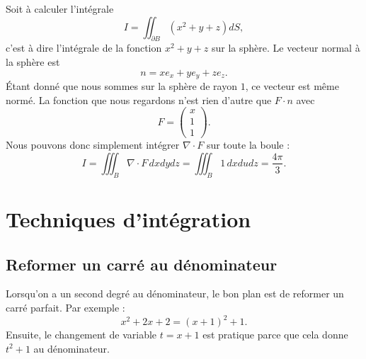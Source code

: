 \begin{example}
    Soit à calculer l'intégrale
    \begin{equation}
        I=\iint_{\partial B}(x^2+y+z)dS,
    \end{equation}
    c'est à dire l'intégrale de la fonction $x^2+y+z$ sur la sphère. Le vecteur normal à la sphère est
    \begin{equation}
        n=xe_x+ye_y+ze_z.
    \end{equation}
    Étant donné que nous sommes sur la sphère de rayon $1$, ce vecteur est même normé. La fonction que nous regardons n'est rien d'autre que $F\cdot n$ avec
    \begin{equation}
        F=\begin{pmatrix}
            x    \\ 
            1    \\ 
            1    
        \end{pmatrix}.
    \end{equation}
    Nous pouvons donc simplement intégrer $\nabla\cdot F$ sur toute la boule :
    \begin{equation}
        I=\iiint_{B}\nabla\cdot F\,dxdydz=\iiint_B 1\,dxdudz=\frac{ 4\pi }{ 3 }.
    \end{equation}
\end{example}

\section{Techniques d'intégration}

\subsection{Reformer un carré au dénominateur}
\label{subsecCarreDenoPar}

Lorsqu'on a un second degré au dénominateur, le bon plan est de reformer un carré parfait. Par exemple : 
\begin{equation}
	x^2+2x+2=(x+1)^2+1.
\end{equation}
Ensuite, le changement de variable $t=x+1$ est pratique parce que cela donne $t^2+1$ au dénominateur.

